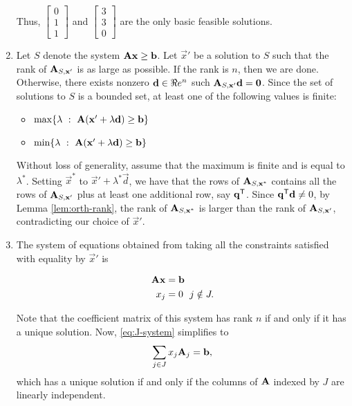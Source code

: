 \begin{enumerate}
  Thus, \(\begin{bmatrix} 0 \\ 1 \\ 1 \end{bmatrix}\) and
  \(\begin{bmatrix} 3 \\ 3 \\ 0 \end{bmatrix}\) are the only basic
  feasible solutions.
\item
  Let \(S\) denote the system \(\mathbf{A}\mathbf{x} \geq \mathbf{b}\). Let
  \(\vec{x}'\) be a solution to \(S\) such that the rank of
  \(\mathbf{A}_{S,\mathbf{x}'}\) is as large as possible. If the rank is \(n\),
  then we are done. Otherwise, there exists nonzero
  \(\mathbf{d} \in \Re e^n\) such \(\mathbf{A}_{S,\mathbf{x}'}\mathbf{d} = \mathbf{0}\).
  Since the set of solutions to \(S\) is a bounded set, at least one of
  the following values is finite:

  \begin{itemize}
  \item
    \(\max \{ \lambda ~:~ \mathbf{A} (\mathbf{x}'+\lambda\mathbf{d}) \geq\mathbf{b}\}\)
  \item
    \(\min \{ \lambda ~:~ \mathbf{A} (\mathbf{x}'+\lambda\mathbf{d}) \geq\mathbf{b}\}\)
  \end{itemize}

  Without loss of generality, assume that the maximum is finite and is
  equal to \(\lambda^*\). Setting \(\vec{x}^*\) to
  \(\vec{x}'+\lambda^* \vec{d}\), we have that the rows of
  \(\mathbf{A}_{S,\mathbf{x}^*}\) contains all the rows of
  \(\mathbf{A}_{S,\mathbf{x}'}\) plus at least one additional row, say
  \(\mathbf{q}^{\mathsf{T}}\). Since \(\mathbf{q}^{\mathsf{T}} \mathbf{d} \neq 0\), by Lemma
  \ref{lem:orth-rank}, the rank of \(\mathbf{A}_{S,\mathbf{x}^*}\) is larger
  than the rank of \(\mathbf{A}_{S,\mathbf{x}'}\), contradicting our choice of
  \(\vec{x}'\).
\item
  The system of equations obtained from taking all the constraints
  satisfied with equality by \(\vec{x}'\) is

  \begin{align}
     \begin{split}
       \mathbf{A}\mathbf{x} & = \mathbf{b} \\
       x_j & = 0 ~~j\notin J.
     \end{split}\label{eq:J-system}
  \end{align}

  Note that the coefficient matrix of this system has rank \(n\) if and
  only if it has a unique solution. Now, \eqref{eq:J-system} simplifies to
  \[ \sum_{j \in J} x_j \mathbf{A}_j = \mathbf{b},
  \] which has a unique solution if and only if the columns of
  \(\mathbf{A}\) indexed by \(J\) are linearly independent.
\end{enumerate}

